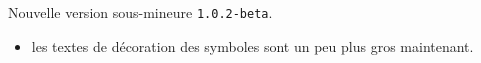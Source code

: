 Nouvelle version sous-mineure \verb+1.0.2-beta+.

\begin{itemize}[itemsep=.5em]
    \item {}
          les textes de décoration des symboles sont un peu plus gros maintenant.
\end{itemize}


\separation
